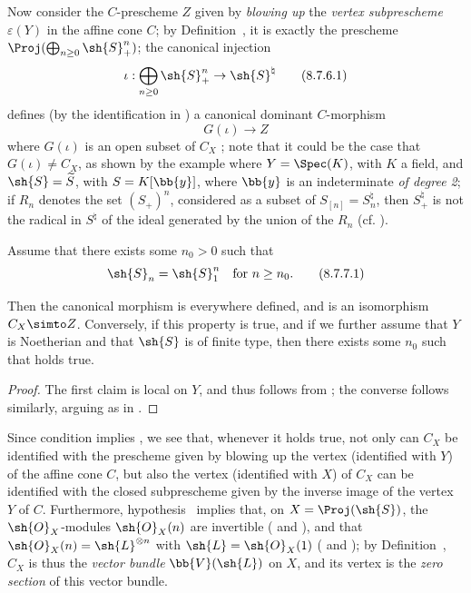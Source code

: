 \begin{env}[8.7.6]
\label{II.8.7.6}
Now consider the $C$-prescheme $Z$ given by \emph{blowing up} the \emph{vertex subprescheme $\varepsilon(Y)$} in the affine cone $C$;
by Definition~, it is exactly the prescheme $\Proj(\bigoplus_{n\geq0}\sh{S}_+^n)$;
the canonical injection
\[
\label{II.8.7.6.1}
  \iota: \bigoplus_{n\geq0} \sh{S}_+^n \to \sh{S}^\natural
\tag{8.7.6.1}
\]
defines (by the identification in ) a canonical dominant $C$-morphism
\[
\label{II.8.7.6.2}
  G(\iota)\to Z
  \tag{8.7.6.2}
\]
where $G(\iota)$ is an open subset of $C_X$ ;
note that it could be the case that $G(\iota)\neq C_X$, as shown by the example where $Y=\Spec(K)$, with $K$ a field, and $\sh{S}=\widetilde{S}$, with $S=K[\bb{y}]$, where $\bb{y}$ is an indeterminate \emph{of degree 2};
if $R_n$ denotes the set $(S_+)^n$, considered as a subset of $S_{[n]}=S_n^\natural$, then $S_+^\natural$ is not the radical in $S^\natural$ of the ideal generated by the union of the $R_n$ (cf. ).
\end{env}

\begin{corollary}[8.7.7]
\label{II.8.7.7}
Assume that there exists some $n_0>0$ such that
\[
\label{II.8.7.7.1}
  \sh{S}_n=\sh{S}_1^n
  \quad
  \text{for }n\geq n_0.
  \tag{8.7.7.1}
\]

Then the canonical morphism  is everywhere defined, and is an isomorphism $C_X\simto Z$.
Conversely, if this property is true, and if we further assume that $Y$ is Noetherian and that $\sh{S}$ is of finite type, then there exists some $n_0$ such that  holds true.
\end{corollary}

\begin{proof}
The first claim is local on $Y$, and thus follows from ;
the converse follows similarly, arguing as in .
\end{proof}

\begin{remark}[8.7.8]
\label{II.8.7.8}
Since condition  implies , we see that, whenever it holds true, not only can $C_X$ be identified with the prescheme given by blowing up the vertex (identified with $Y$) of the affine cone $C$, but also the vertex (identified with $X$) of $C_X$ can be identified with the closed subprescheme given by the inverse image of the vertex $Y$ of $C$.
Furthermore, hypothesis~ implies that, on $X=\Proj(\sh{S})$, the $\sh{O}_X$-modules $\sh{O}_X(n)$ are invertible ( and ), and that $\sh{O}_X(n)=\sh{L}^{\otimes n}$ with $\sh{L}=\sh{O}_X(1)$ ( and );
by Definition~, $C_X$ is thus the \emph{vector bundle} $\bb{V}(\sh{L})$ on $X$, and its vertex is the \emph{zero section} of this vector bundle.
\end{remark}

